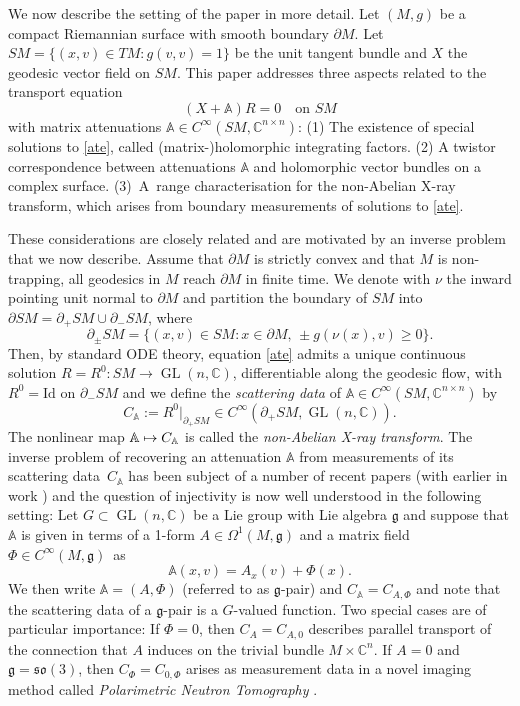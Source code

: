 \documentclass[JEP,XML,SOM,Unicode,published]{cedram}
\newcommand\mto{\mathchoice{\longmapsto}{\mapsto}{\mapsto}{\mapsto}}
\DeclareMathOperator{\GL}{GL}
\theoremstyle{plain}
\theoremstyle{definition}
\newcommand{\A}{\mathbb{A}}
\newcommand{\C}{\mathbb{C}}
\newcommand{\g}{\mathfrak{g}}
\newcommand{\so}{\mathfrak{so}}
\newcommand{\Id}{\mathrm{Id}}
\newcommand{\1}{{\bf 1}}
\begin{document}
We now describe the setting of the paper in more detail.
Let $(M,g)$ be a compact Riemannian surface with smooth boundary $\partial M$. Let \hbox{$SM=\{(x,v)\!\in\! TM: g(v,v)\!=\!1\}$} be the unit tangent bundle and $X$ the geodesic vector field on $SM$. This paper addresses three aspects related to the transport equation
\begin{equation}\label{ate}
(X+\A)R=0\quad\text{on } SM
\end{equation}
with matrix attenuations $\A\in C^\infty(SM,\C^{n\times n})$: (1) The existence of special solutions to \eqref{ate}, called (matrix-)holomorphic integrating factors. (2) A twistor correspondence between attenuations $\A$ and holomorphic vector bundles on a complex surface. (3)~A~range characterisation for the non-Abelian X-ray transform, which arises from boundary measurements of solutions to \eqref{ate}.

These considerations are closely related and are motivated by an inverse problem that we now describe. Assume that $\partial M$ is strictly convex and that $M$ is non-trapping, \ie all geodesics in $M$ reach $\partial M$ in finite time. We denote with $\nu$ the inward pointing unit normal to $\partial M$ and partition the boundary of $SM$ into $\partial SM= \partial_+SM \cup \partial_-SM$, where
\[\partial_\pm SM=\{(x,v)\in SM: x\in \partial M,\, \pm g( \nu(x),v) \ge 0\}.\] Then, by standard ODE theory, equation \eqref{ate} admits a unique continuous solution $R=R^0:SM\to \GL(n,\C)$, differentiable along the geodesic flow, with $R^0 = \Id$ on $\partial_-SM$ and we define the \emph{scattering data} of $\A\in C^\infty(SM,\C^{n\times n})$ by
\begin{equation*}
C_\A := R^0\vert_{\partial_+SM}\in C^\infty(\partial_+SM,\GL(n,\C)).
\end{equation*}
The nonlinear map $\A \mto C_\A$ is called the \emph{non-Abelian X-ray transform}.
The inverse problem of recovering an attenuation $\A$ from measurements of its scattering data~$C_\A$ has been
subject of a number of recent papers \cite{PSU12,PaSa20,MNP19} (with earlier in work \cite{Ver91,Sha00, FiUh01, Nov02,Esk04}) and the question of injectivity is now well understood in the following setting: Let $G\subset \GL(n,\C)$ be a Lie group with Lie algebra $\g$ and suppose that $\A$ is given in terms of a 1-form $A\in \Omega^1(M,\g)$ and a matrix field $\Phi\in C^\infty(M,\g)$~as
\begin{equation*}
\A(x,v) =A_x(v) + \Phi(x).
\end{equation*}
We then write $\A=(A,\Phi)$ (referred to as $\g$-pair) and $C_\A=C_{A,\Phi}$ and note that the scattering data of a $\g$-pair is a $G$-valued function. Two special cases are of particular importance: If $\Phi=0$, then $C_A=C_{A,0}$ describes parallel transport of the connection that $A$ induces on the trivial bundle $M\times \C^n$. If $A=0$ and $\g=\so(3)$, then $C_\Phi = C_{0,\Phi}$ arises as measurement data in a novel imaging method called \emph{Polarimetric Neutron Tomography} \cite{DL_20,MNP19,nature1,nature2}.
\end{document}
